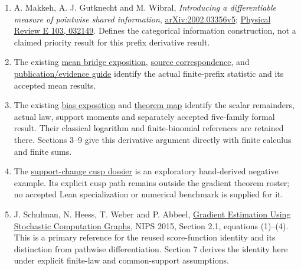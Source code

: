 \documentclass[11pt,a4paper]{article}
\providecommand{\tightlist}{\setlength{\itemsep}{0pt}\setlength{\parskip}{0pt}}
\begin{document}
\begin{enumerate}
\def\labelenumi{\arabic{enumi}.}
\tightlist
\item
  A. Makkeh, A. J. Gutknecht and M. Wibral, \emph{Introducing a differentiable measure of pointwise shared information}, \href{https://arxiv.org/abs/2002.03356v5}{arXiv:2002.03356v5}; \href{https://doi.org/10.1103/PhysRevE.103.032149}{Physical Review E 103, 032149}. Defines the categorical information construction, not a claimed priority result for this prefix derivative result.
\item
  The existing \href{https://github.com/sepahead/pid-rs/blob/main/audit/formal/lean-prefix-mgw-mean/EXPOSITION.current.md}{mean bridge exposition}, \href{https://github.com/sepahead/pid-rs/blob/main/audit/formal/lean-prefix-mgw-mean/SOURCE_CORRESPONDENCE.md}{source correspondence}, and \href{https://github.com/sepahead/pid-rs/blob/main/audit/formal/lean-prefix-mgw-mean/PUBLICATION.md}{publication/evidence guide} identify the actual finite-prefix statistic and its accepted mean results.
\item
  The existing \href{https://github.com/sepahead/pid-rs/blob/main/audit/formal/lean-prefix-mgw-bias/EXPOSITION.md}{bias exposition} and \href{https://github.com/sepahead/pid-rs/blob/main/audit/formal/lean-prefix-mgw-bias/THEOREM_MAP.md}{theorem map} identify the scalar remainders, actual law, support moments and separately accepted five-family formal result. Their classical logarithm and finite-binomial references are retained there. Sections 3--9 give this derivative argument directly with finite calculus and finite sums.
\item
  The \href{https://github.com/sepahead/pid-rs/blob/main/audit/research/support-change-mi-cusp/EXPOSITION.md}{support-change cusp dossier} is an exploratory hand-derived negative example. Its explicit cusp path remains outside the gradient theorem roster; no accepted Lean specialization or numerical benchmark is supplied for it.
\item
  J. Schulman, N. Heess, T. Weber and P. Abbeel, \href{https://proceedings.neurips.cc/paper/2015/file/de03beffeed9da5f3639a621bcab5dd4-Paper.pdf}{Gradient Estimation Using Stochastic Computation Graphs}, NIPS 2015, Section 2.1, equations (1)--(4). This is a primary reference for the reused score-function identity and its distinction from pathwise differentiation. Section 7 derives the identity here under explicit finite-law and common-support assumptions.
\end{enumerate}
\end{document}
